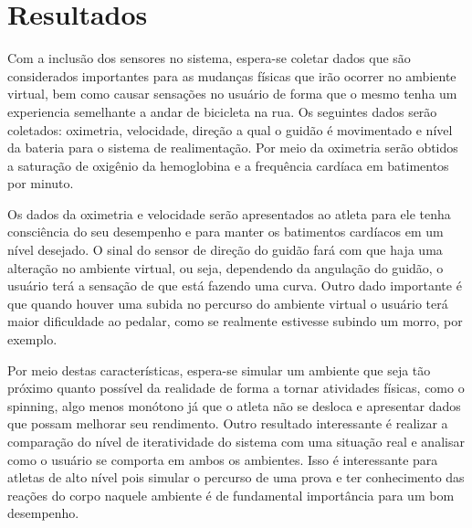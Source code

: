 \chapter[Resultados]{Resultados}

Com a inclusão dos sensores no sistema, espera-se coletar dados que são considerados importantes para as mudanças físicas que irão ocorrer no ambiente virtual, bem como causar sensações no usuário de forma que o mesmo tenha um experiencia semelhante a andar de bicicleta na rua. Os seguintes dados serão coletados: oximetria, velocidade, direção a qual o guidão é movimentado e nível da bateria para o sistema de realimentação. Por meio da oximetria serão obtidos a saturação de oxigênio da hemoglobina e a frequência cardíaca em batimentos por minuto.

Os dados da oximetria e velocidade serão apresentados ao atleta para ele tenha consciência do seu desempenho e para manter os batimentos cardíacos em um nível desejado. O sinal do sensor de direção do guidão fará com que haja uma alteração no ambiente virtual, ou seja, dependendo da angulação do guidão, o usuário terá a sensação de que está fazendo uma curva. Outro dado importante é que quando houver uma subida no percurso do ambiente virtual o usuário terá maior dificuldade ao pedalar, como se realmente estivesse subindo um morro, por exemplo.

Por meio destas características, espera-se simular um ambiente que seja tão próximo quanto possível da realidade de forma a tornar atividades físicas, como o spinning, algo menos monótono já que o atleta não se desloca e apresentar dados que possam melhorar seu rendimento. Outro resultado interessante é realizar a comparação do nível de iteratividade do sistema com uma situação real e analisar como o usuário se comporta em ambos os ambientes. Isso é interessante para atletas de alto nível pois simular o percurso de uma prova e ter conhecimento das reações do corpo naquele ambiente é de fundamental importância para um bom desempenho.

